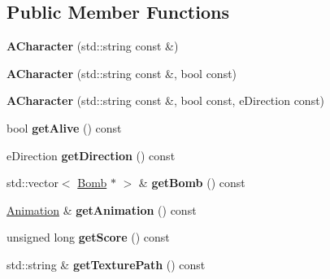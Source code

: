 \subsection*{Public Member Functions}
\begin{DoxyCompactItemize}
\item 
\hypertarget{class_a_character_a1bb3b7cacff54f459b84f32d054d930d}{}{\bfseries A\+Character} (std\+::string const \&)\label{class_a_character_a1bb3b7cacff54f459b84f32d054d930d}

\item 
\hypertarget{class_a_character_abcffefc39b7be7213c175f50a3129504}{}{\bfseries A\+Character} (std\+::string const \&, bool const)\label{class_a_character_abcffefc39b7be7213c175f50a3129504}

\item 
\hypertarget{class_a_character_a5c6d10a4a55a39cb49cf9683add15c82}{}{\bfseries A\+Character} (std\+::string const \&, bool const, e\+Direction const)\label{class_a_character_a5c6d10a4a55a39cb49cf9683add15c82}

\item 
\hypertarget{class_a_character_abc7b2f62e341406bc29e194c74b4a854}{}bool {\bfseries get\+Alive} () const \label{class_a_character_abc7b2f62e341406bc29e194c74b4a854}

\item 
\hypertarget{class_a_character_a7aed2f1260c22a6b749eb46c613af07f}{}e\+Direction {\bfseries get\+Direction} () const \label{class_a_character_a7aed2f1260c22a6b749eb46c613af07f}

\item 
\hypertarget{class_a_character_aef1c9a4209392282d594d7b12616cfd1}{}std\+::vector$<$ \hyperlink{class_bomb}{Bomb} $\ast$ $>$ \& {\bfseries get\+Bomb} () const \label{class_a_character_aef1c9a4209392282d594d7b12616cfd1}

\item 
\hypertarget{class_a_character_aca55bd2654486d051bcef718698aaf8f}{}\hyperlink{class_animation}{Animation} \& {\bfseries get\+Animation} () const \label{class_a_character_aca55bd2654486d051bcef718698aaf8f}

\item 
\hypertarget{class_a_character_a534658c68bf530360b93d6ab7dd3c9ae}{}unsigned long {\bfseries get\+Score} () const \label{class_a_character_a534658c68bf530360b93d6ab7dd3c9ae}

\item 
\hypertarget{class_a_character_aa457888a5bf6986c578da13dab917715}{}std\+::string \& {\bfseries get\+Texture\+Path} () const \label{class_a_character_aa457888a5bf6986c578da13dab917715}


\end{DoxyCompactItemize}
